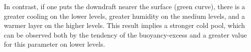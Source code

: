 In contrast, if one puts the downdraft nearer the surface (green curve), there is a greater cooling on the lower levels, greater humidity on the medium levels, and a warmer layer on the higher levels. This result implies a stronger cold pool, which can be observed both by the tendency of the buoyancy-excess and a greater value for this parameter on lower levels.










